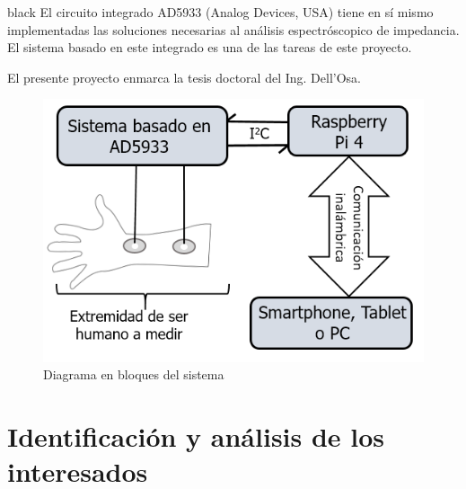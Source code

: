 \documentclass[11pt]{charter}
\begin{document}
\begin{consigna}{black}
El circuito integrado AD5933 (Analog Devices, USA) tiene en sí mismo implementadas las soluciones necesarias al análisis espectróscopico de impedancia. El sistema basado en este integrado es una de las tareas de este proyecto.

El presente proyecto enmarca la tesis doctoral del Ing. Dell’Osa.

\vspace{25px}

\begin{figure}[H]
\centering 
\includegraphics[width=.7\textwidth]{./Figuras/diagBloques_def.png}
\caption{Diagrama en bloques del sistema}
\label{fig:diagBloques_borrador}
\end{figure}

\vspace{25px}
\end{consigna}

\pagebreak

\section{Identificación y análisis de los interesados}
\label{sec:interesados}
\end{document}
